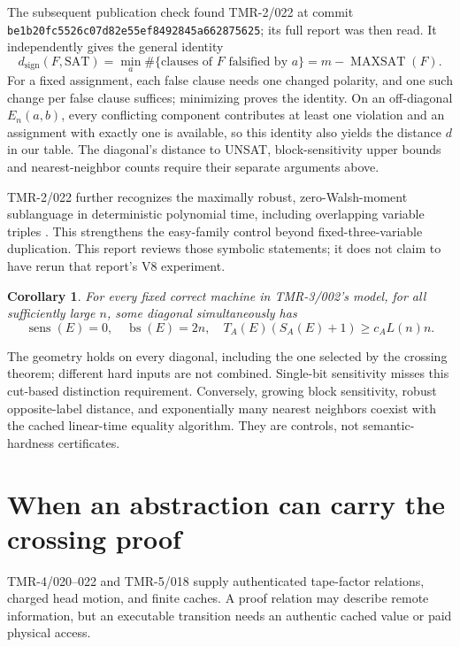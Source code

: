 \documentclass[11pt]{article}
\newtheorem{corollary}[theorem]{Corollary}
\newcommand{\sens}{\operatorname{sens}}
\newcommand{\bs}{\operatorname{bs}}
\begin{document}
The subsequent publication check found TMR-2/022 at commit
\texttt{be1b20fc5526c07d82e55ef8492845a662875625}; its full report was then read. It independently gives the general identity
\[
d_{\mathrm{sign}}(F,\mathrm{SAT})
=\min_a \#\{\text{clauses of }F\text{ falsified by }a\}
=m-\operatorname{MAXSAT}(F).
\]
For a fixed assignment, each false clause needs one changed polarity, and one such change per false clause suffices; minimizing proves the identity. On an off-diagonal \(E_n(a,b)\), every conflicting component contributes at least one violation and an assignment with exactly one is available, so this identity also yields the distance \(d\) in our table. The diagonal's distance to UNSAT, block-sensitivity upper bounds and nearest-neighbor counts require their separate arguments above.

TMR-2/022 further recognizes the maximally robust, zero-Walsh-moment sublanguage in deterministic polynomial time, including overlapping variable triples \cite{maxsat}. This strengthens the easy-family control beyond fixed-three-variable duplication. This report reviews those symbolic statements; it does not claim to have rerun that report's V8 experiment.

\begin{corollary}
For every fixed correct machine in TMR-3/002's model, for all sufficiently large \(n\), some diagonal simultaneously has
\[
\sens(E)=0,\quad \bs(E)=2n,\quad
T_A(E)(S_A(E)+1)\ge c_A L(n)n.
\]
\end{corollary}
The geometry holds on every diagonal, including the one selected by the crossing theorem; different hard inputs are not combined. Single-bit sensitivity misses this cut-based distinction requirement. Conversely, growing block sensitivity, robust opposite-label distance, and exponentially many nearest neighbors coexist with the cached linear-time equality algorithm. They are controls, not semantic-hardness certificates.

\section{When an abstraction can carry the crossing proof}
TMR-4/020--022 and TMR-5/018 supply authenticated tape-factor relations, charged head motion, and finite caches. A proof relation may describe remote information, but an executable transition needs an authentic cached value or paid physical access.
\end{document}
